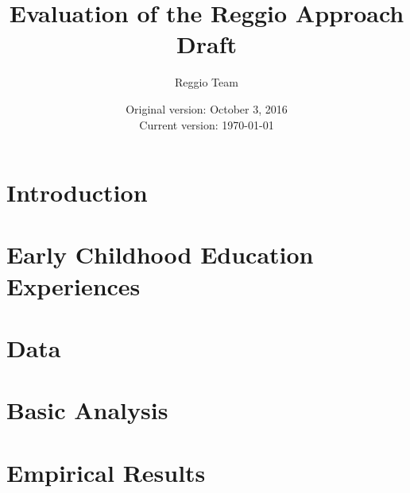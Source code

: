 




\title{\Large \textbf{Evaluation of the Reggio Approach} \\ Draft}
\author{\normalsize Reggio Team}
\date{\normalsize Original version: October 3, 2016 \\ Current version: \today}
\maketitle

\tableofcontents

\doublespacing

\section{Introduction}
\label{sec:introduction}


\section{Early Childhood Education Experiences}
\label{sec:eceexperiences}


\section{Data}
\label{sec:data}


\section{Basic Analysis}
\label{sec:methodology}


\section{Empirical Results}
\label{sec:results}


\clearpage




\clearpage
\begin{appendices}
\label{sec:Appendix}

\end{appendices}


